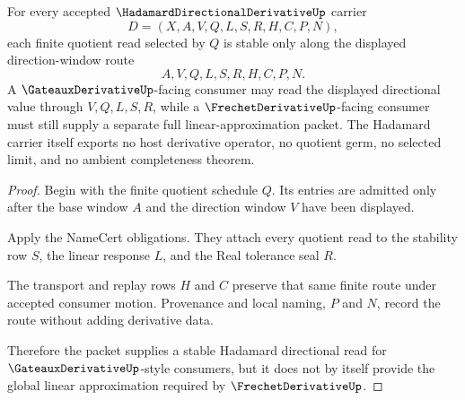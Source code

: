 \begin{theorem}
\label{thm:hadamard-directional-derivative-finite-step-stability}
For every accepted $\HadamardDirectionalDerivativeUp$ carrier
$$
D=(X,A,V,Q,L,S,R,H,C,P,N),
$$
each finite quotient read selected by $Q$ is stable only along the displayed direction-window route
$$
A,V,Q,L,S,R,H,C,P,N .
$$
A $\GateauxDerivativeUp$-facing consumer may read the displayed directional value through $V,Q,L,S,R$, while a $\FrechetDerivativeUp$-facing consumer must still supply a separate full linear-approximation packet. The Hadamard carrier itself exports no host derivative operator, no quotient germ, no selected limit, and no ambient completeness theorem.
\end{theorem}
\begin{proof}
Begin with the finite quotient schedule $Q$. Its entries are admitted only after the base window $A$ and the direction window $V$ have been displayed.

Apply the NameCert obligations. They attach every quotient read to the stability row $S$, the linear response $L$, and the Real tolerance seal $R$.

The transport and replay rows $H$ and $C$ preserve that same finite route under accepted consumer motion. Provenance and local naming, $P$ and $N$, record the route without adding derivative data.

Therefore the packet supplies a stable Hadamard directional read for $\GateauxDerivativeUp$-style consumers, but it does not by itself provide the global linear approximation required by $\FrechetDerivativeUp$.
\end{proof}



